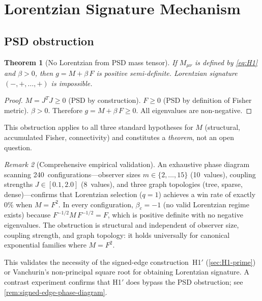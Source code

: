 \documentclass[11pt]{article}
\newtheorem{theorem}{Theorem}[section]
\theoremstyle{definition}
\theoremstyle{remark}
\newtheorem{remark}[theorem]{Remark}
\begin{document}
\section{Lorentzian Signature Mechanism}
\label{sec:lorentzian}

\subsection{PSD obstruction}
\label{sec:psd-obstruction}

\begin{theorem}[No Lorentzian from PSD mass tensor]
\label{thm:psd-obstruction}
If $M_{\mu\nu}$ is defined by \cref{eq:H1} and $\beta > 0$, then
$g = M + \beta\,F$ is positive semi-definite.
Lorentzian signature $(-,+,\ldots,+)$ is impossible.
\end{theorem}

\begin{proof}
$M = J^T J \geq 0$ (PSD by construction).
$F \geq 0$ (PSD by definition of Fisher metric).
$\beta > 0$.
Therefore $g = M + \beta\,F \geq 0$.
All eigenvalues are non-negative.
\end{proof}

This obstruction applies to all three standard hypotheses for $M$
(structural, accumulated Fisher, connectivity) and constitutes a
\emph{theorem}, not an open question.

\begin{remark}[Comprehensive empirical validation]
\label{rem:psd-phase-diagram}
An exhaustive phase diagram scanning 240~configurations---observer
sizes $m \in \{2, \ldots, 15\}$ (10~values), coupling strengths
$J \in [0.1, 2.0]$ (8~values), and three graph topologies (tree,
sparse, dense)---confirms that Lorentzian selection ($q = 1$)
achieves a win rate of exactly~$0\%$ when $M = F^2$.
In every configuration, $\beta_c = -1$ (no valid Lorentzian regime
exists) because $F^{-1/2} M\, F^{-1/2} = F$, which is positive
definite with no negative eigenvalues.
The obstruction is structural and independent of observer size,
coupling strength, and graph topology: it holds universally for
canonical exponential families where $M = F^2$.

This validates the necessity of the signed-edge construction~H1$'$
(\cref{sec:H1-prime}) or Vanchurin's non-principal square root for
obtaining Lorentzian signature.
A contrast experiment confirms that H1$'$ does bypass the PSD
obstruction; see \cref{rem:signed-edge-phase-diagram}.
\end{remark}
\end{document}
